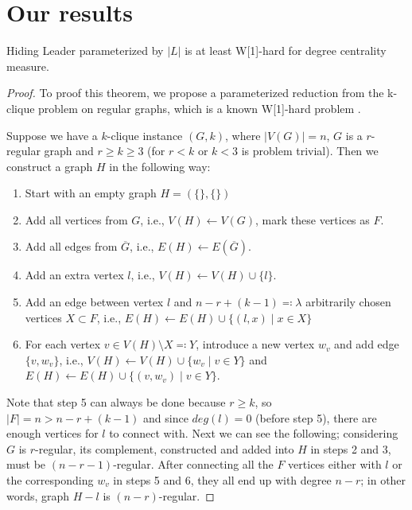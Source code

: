 \chapter{Our results}

\begin{theorem}
    Hiding Leader parameterized by $|L|$ is at least W[1]-hard for degree centrality measure.
\end{theorem}
\begin{proof}
    To proof this theorem, we propose a parameterized reduction from the k-clique problem on regular graphs, which is a known W[1]-hard problem \cite[p.~427]{Cygan2015}.
    
    Suppose we have a $k$-clique instance $(G, k)$, where $|V(G)|=n$, $G$ is a $r$-regular graph and $r \geq k \geq 3$
    (for $r < k$ or $k < 3$ is problem trivial).
    Then we construct a graph $H$ in the following way:
    \begin{enumerate}
        \item Start with an empty graph $H = (\{\}, \{\})$
        \item Add all vertices from $G$, i.e., $V(H) \leftarrow V(G)$, mark these vertices as $F$.
        \item Add all edges from $\overline{G}$, i.e., $E(H) \leftarrow E(\overline{G})$.
        \item Add an extra vertex $l$, i.e., $V(H) \leftarrow V(H)\cup\{l\}$.
        \item Add an edge between vertex $l$ and $n - r + (k - 1) \eqqcolon \lambda$ arbitrarily chosen vertices $X \subset F$,
              i.e., $E(H) \leftarrow E(H) \cup \{ (l, x) \mid x \in X \}$
        \item For each vertex $v \in V(H) \setminus X \eqqcolon Y$, introduce a new vertex $w_v$ and add edge $\{v, w_v\}$, i.e.,
              $V(H) \leftarrow V(H) \cup \{ w_v \mid v \in Y \}$ and
              $E(H) \leftarrow E(H) \cup \{ (v, w_v) \mid v \in Y \}$.
    \end{enumerate}
    Note that step 5 can always be done because $r \ge k$, so $|F| = n > n - r + (k - 1)$
    and since $deg(l) = 0$ (before step 5), there are enough vertices for $l$ to connect with. 
    Next we can see the following; considering $G$ is $r$-regular, its complement, constructed and added into $H$ in steps 2 and 3, must be $(n-r-1)$-regular.
    After connecting all the $F$ vertices either with $l$ or the corresponding $w_v$ in steps 5 and 6,
    they all end up with degree $n-r$;
    in other words, graph $H - l$ is $(n-r)$-regular.


\end{proof}
